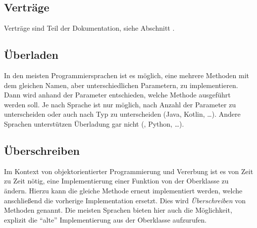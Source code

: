 \subsection{Verträge} \functionalMark \imperativeMark \oopMark
	Verträge sind Teil der Dokumentation, siehe Abschnitt .

\subsection{Überladen} \functionalMark \imperativeMark \oopMark
	In den meisten Programmiersprachen ist es möglich, eine mehrere Methoden mit dem gleichen Namen, aber unterschiedlichen Parametern, zu implementieren. Dann wird anhand der Parameter entschieden, welche Methode ausgeführt werden soll. Je nach Sprache ist nur möglich, nach Anzahl der Parameter zu unterscheiden oder auch nach Typ zu unterscheiden (Java, Kotlin, \dots). Andere Sprachen unterstützen Überladung gar nicht (\racket, Python, \dots).

\subsection{Überschreiben} \oopMark
	Im Kontext von objektorientierter Programmierung und Vererbung ist es von Zeit zu Zeit nötig, eine Implementierung einer Funktion von der Oberklasse zu ändern. Hierzu kann die gleiche Methode erneut implementiert werden, welche anschließend die vorherige Implementation ersetzt. Dies wird \textit{Überschreiben} von Methoden genannt. Die meisten Sprachen bieten hier auch die Möglichkeit, explizit die \enquote{alte} Implementierung aus der Oberklasse aufzurufen.
